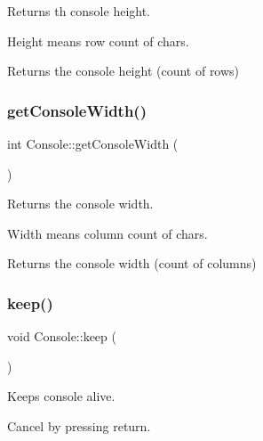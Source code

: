 Returns th console height. 

Height means row count of chars.

\begin{DoxyReturn}{Returns}
the console height (count of rows) 
\end{DoxyReturn}
\mbox{\label{class_console_ad8d4f4d8995f01c97ecb29da2460f7e4}} 
\subsubsection{\texorpdfstring{getConsoleWidth()}{getConsoleWidth()}}
{\footnotesize\ttfamily int Console\+::get\+Console\+Width (\begin{DoxyParamCaption}{ }\end{DoxyParamCaption})\hspace{0.3cm}{\ttfamily [static]}}



Returns the console width. 

Width means column count of chars.

\begin{DoxyReturn}{Returns}
the console width (count of columns) 
\end{DoxyReturn}
\mbox{\label{class_console_a0d9c8a62ea99c6e7cc7b59975785c802}} 
\subsubsection{\texorpdfstring{keep()}{keep()}}
{\footnotesize\ttfamily void Console\+::keep (\begin{DoxyParamCaption}{ }\end{DoxyParamCaption})\hspace{0.3cm}{\ttfamily [static]}}



Keeps console alive. 

Cancel by pressing return. \mbox{\label{class_console_a4431c41c8648bc54c933add04e2032e7}} 
